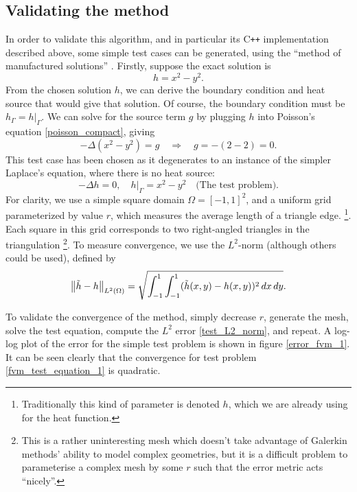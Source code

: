 \subsection{Validating the method}
In order to validate this algorithm, and in particular its C\texttt{++} implementation described above, some simple test cases can be generated,
using the ``method of manufactured solutions'' \cite{fenics_tutorial}.
Firstly, suppose the exact solution is
$$
    h = x^2 - y^2.
$$
From the chosen solution $h$, we can derive the boundary condition and heat source that would give that solution.
Of course, the boundary condition must be $h_\Gamma = \left.h\right|_\Gamma$. We can solve for the source term $g$ by
plugging $h$ into Poisson's equation \eqref{poisson_compact}, giving
$$
    -\Delta\left(x^2 - y^2\right) = g \quad \Rightarrow \quad g = -(2 - 2) = 0.
$$
This test case has been chosen as it degenerates to an instance of the simpler Laplace's equation, where there is no heat source:
\begin{equation}\label{fvm_test_equation_1}
    -\Delta h = 0,\quad \left.h\right|_\Gamma = x^2 - y^2 \quad \text{(The test problem)}.
\end{equation}
For clarity, we use a simple square domain $\Omega = [-1,1]^2$, and a uniform grid parameterized by value $r$, which measures
the average length of a triangle edge.
\footnote{Traditionally this kind of parameter is denoted $h$, which we are already using for the heat function.}.
Each square in this grid
corresponds to two right-angled triangles in the triangulation
\footnote{This is a rather uninteresting mesh which doesn't take advantage
of Galerkin methods' ability to model complex geometries, but it is a difficult problem to parameterise a complex mesh by some $r$ such that the error
metric acts ``nicely''.}.
To measure convergence, we use the $L^2$-norm (although others could be used), defined by
\begin{equation}\label{test_L2_norm}
    \norm{\tilde{h} - h}_{L^2(\Omega)} = \sqrt{\int_{-1}^1\int_{-1}^1 (\tilde{h}(x,y) - h(x,y))^2 \,dx\,dy}.
\end{equation}

To validate the convergence of the method, simply decrease $r$, generate the mesh, solve the test equation,
compute the $L^2$ error \eqref{test_L2_norm}, and repeat. A log-log plot of the error for the simple test problem is shown in figure
\ref{error_fvm_1}.
It can be seen clearly that the convergence for test problem \eqref{fvm_test_equation_1} is quadratic.

